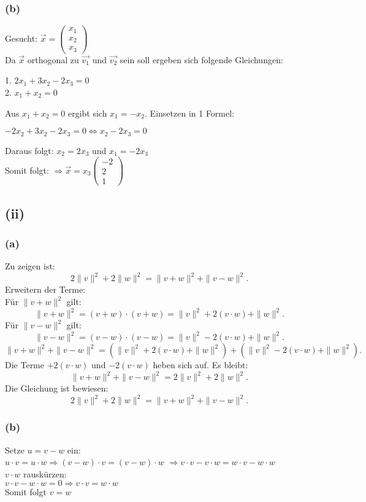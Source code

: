 \documentclass{article}
\begin{document}
\subsubsection{(b)}
Gesucht: $\vec{x}= \left(\begin{array}{c} x_1\\ x_2 \\x_3 \end{array}\right)$ \\ \newline
Da $\vec{x}$ orthogonal zu $\vec{v_1}$ und $\vec{v_2}$ sein soll ergeben sich folgende Gleichungen: 
\begin{center}
    1. $2x_1+3x_2-2x_3=0$ \\
    2. $x_1+x_2=0$
\end{center}
Aus $x_1+x_2=0$ ergibt sich $x_1= -x_2$. Einsetzen in 1 Formel: 
\begin{center}
    $-2x_2 + 3x_2-2x_3=0 \Leftrightarrow x_2-2x_3=0$ \\
\end{center}
Daraus folgt: $x_2= 2x_3$ und $x_1=-2x_3$ \\
Somit folgt: $\Longrightarrow \vec{x} = x_3\left(\begin{array}{c} -2\\ 2 \\1 \end{array}\right)$

\subsection{(ii)}
\subsubsection{(a)}
Zu zeigen ist:
\[2\|v\|^2 + 2\|w\|^2 = \|v + w\|^2 + \|v - w\|^2.\] 
Erweitern der Terme:\\
Für \(\|v + w\|^2\) gilt:
\[\|v + w\|^2 = (v + w) \cdot (v + w) = \|v\|^2 + 2(v \cdot w) + \|w\|^2.\]
Für \(\|v - w\|^2\) gilt:
\[\|v - w\|^2 = (v - w) \cdot (v - w) = \|v\|^2 - 2(v \cdot w) + \|w\|^2.\]
\[\|v + w\|^2 + \|v - w\|^2 = (\|v\|^2 + 2(v \cdot w) + \|w\|^2) + (\|v\|^2 - 2(v \cdot w) + \|w\|^2).\]
Die Terme \(+2(v \cdot w)\) und \(-2(v \cdot w)\) heben sich auf. Es bleibt:
\[\|v + w\|^2 + \|v - w\|^2 = 2\|v\|^2 + 2\|w\|^2.\]
Die Gleichung ist bewiesen:
\[2\|v\|^2 + 2\|w\|^2 = \|v + w\|^2 + \|v - w\|^2.\]



\subsubsection{(b)}
Setze $u=v-w$ ein: \\
$u\cdot v= u\cdot w \Longrightarrow (v-w)\cdot v = (v-w)\cdot w$
$\Longrightarrow v\cdot v - v \cdot w = w \cdot v - w \cdot w$ \\
$v\cdot w$ rauskürzen: \\
$v \cdot v - w \cdot w = 0 \Longrightarrow v\cdot v = w\cdot w$ \\
Somit folgt $v=w$
\end{document}
